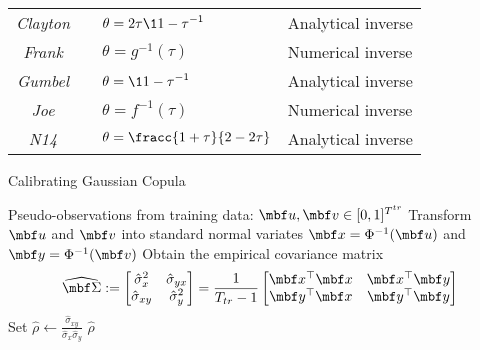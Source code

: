 \vspace{0.2cm}
{\centering
\renewcommand{\arraystretch}{1.2}  
\begin{tabular}{ccll}
\textit{Clayton} && 
$\displaystyle 
\theta = {2\tau}\1{1-\tau}^{-1}
$ 
& Analytical inverse
\\
\textit{Frank} && 
$\displaystyle 
\theta = g^{-1}(\tau)
$ 
& Numerical inverse
\\
\textit{Gumbel} && 
$\displaystyle 
\theta = \1{1-\tau}^{-1}
$ 
& Analytical inverse
\\
\textit{Joe} && 
$\displaystyle 
\theta = f^{-1}(\tau) 
$
& Numerical inverse
\\
\textit{N14} && 
$\displaystyle
\theta = \fracc{1+\tau}{2-2\tau}
$
& Analytical inverse
\\
\end{tabular}
\par}



\begin{algorithm}[H]
\label{alg:calibrating_gaussian}
\caption{Calibrating Gaussian Copula}
\begin{algorithmic}[1]
\Require Pseudo-observations from training data: $\mbf u,\mbf v\in [0,1]^{T^{tr}}$
\State Transform $\mbf u$ and $\mbf v$ into standard normal variates $\mbf x=\Phi^{-1}(\mbf u)$ and $\mbf y=\Phi^{-1}(\mbf v)$%
\State Obtain the empirical covariance matrix 
$$
\widehat{\mbf \Sigma} 
:=\begin{bmatrix} 
			\hat \sigma_{x}^2 & \hat \sigma_{yx} \\
			\hat \sigma_{xy} & \hat \sigma_{y}^2
		\end{bmatrix}
= \frac{1}{T_{tr}-1}\begin{bmatrix} \mbf x^\top\mbf x & \mbf x^\top\mbf y \\ \mbf y^\top\mbf x & \mbf y^\top\mbf y \end{bmatrix}$$
\State Set $\displaystyle \hat \rho \gets \frac{\hat \sigma_{xy}}{\hat \sigma_x \hat \sigma_y}$
\Ensure $\hat \rho$
\end{algorithmic}
\end{algorithm}


